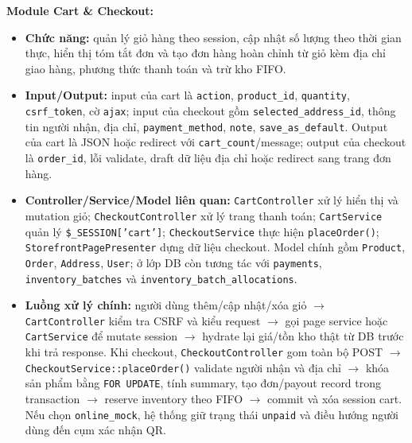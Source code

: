 \documentclass[a4paper]{article}
\begin{document}
\textbf{Module Cart \& Checkout:}
\begin{itemize}
    \item \textbf{Chức năng:} quản lý giỏ hàng theo session, cập nhật số lượng theo thời gian thực, hiển thị tóm tắt đơn và tạo đơn hàng hoàn chỉnh từ giỏ kèm địa chỉ giao hàng, phương thức thanh toán và trừ kho FIFO.
    \item \textbf{Input/Output:} input của cart là \texttt{action}, \texttt{product\_id}, \texttt{quantity}, \texttt{csrf\_token}, cờ \texttt{ajax}; input của checkout gồm \texttt{selected\_address\_id}, thông tin người nhận, địa chỉ, \texttt{payment\_method}, \texttt{note}, \texttt{save\_as\_default}. Output của cart là JSON hoặc redirect với \texttt{cart\_count}/message; output của checkout là \texttt{order\_id}, lỗi validate, draft dữ liệu địa chỉ hoặc redirect sang trang đơn hàng.
    \item \textbf{Controller/Service/Model liên quan:} \texttt{CartController} xử lý hiển thị và mutation giỏ; \texttt{CheckoutController} xử lý trang thanh toán; \texttt{CartService} quản lý \texttt{\$\_SESSION['cart']}; \texttt{CheckoutService} thực hiện \texttt{placeOrder()}; \texttt{StorefrontPagePresenter} dựng dữ liệu checkout. Model chính gồm \texttt{Product}, \texttt{Order}, \texttt{Address}, \texttt{User}; ở lớp DB còn tương tác với \texttt{payments}, \texttt{inventory\_batches} và \texttt{inventory\_batch\_allocations}.
    \item \textbf{Luồng xử lý chính:} người dùng thêm/cập nhật/xóa giỏ $\to$ \texttt{CartController} kiểm tra CSRF và kiểu request $\to$ gọi page service hoặc \texttt{CartService} để mutate session $\to$ hydrate lại giá/tồn kho thật từ DB trước khi trả response. Khi checkout, \texttt{CheckoutController} gom toàn bộ POST $\to$ \texttt{CheckoutService::placeOrder()} validate người nhận và địa chỉ $\to$ khóa sản phẩm bằng \texttt{FOR UPDATE}, tính summary, tạo đơn/payout record trong transaction $\to$ reserve inventory theo FIFO $\to$ commit và xóa session cart. Nếu chọn \texttt{online\_mock}, hệ thống giữ trạng thái \texttt{unpaid} và điều hướng người dùng đến cụm xác nhận QR.
\end{itemize}
\end{document}
